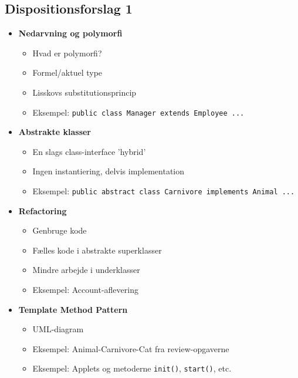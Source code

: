 \subsection{Dispositionsforslag 1}

\begin{itemize}
    \item \textbf{Nedarvning og polymorfi}
    \begin{itemize}
        \item Hvad er polymorfi?
        \item Formel/aktuel type
        \item Lisskovs substitutionsprincip
        \item Eksempel: \verb|public class Manager extends Employee ...|
    \end{itemize}
    
    \item \textbf{Abstrakte klasser}
    \begin{itemize}
        \item En slags class-interface 'hybrid'
        \item Ingen instantiering, delvis implementation
        \item Eksempel: \verb|public abstract class Carnivore implements Animal ...|
    \end{itemize}
    
    \item \textbf{Refactoring}
    \begin{itemize}
        \item Genbruge kode
        \item Fælles kode i abstrakte superklasser
        \item Mindre arbejde i underklasser
        \item Eksempel: Account-aflevering
    \end{itemize}
    
    \item \textbf{Template Method Pattern}
    \begin{itemize}
        \item UML-diagram
        \item Eksempel: Animal-Carnivore-Cat fra review-opgaverne
        \item Eksempel: Applets og metoderne \verb|init()|, \verb|start()|, etc.
    \end{itemize}
    
\end{itemize}
